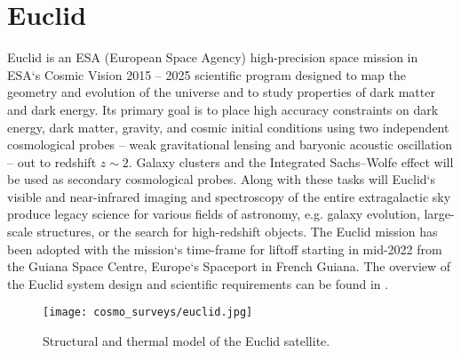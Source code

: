 \section{Euclid}
Euclid is an ESA (European Space Agency) high-precision space mission in ESA`s Cosmic Vision 2015 -- 2025 scientific program designed to map the geometry and evolution of the universe and to study properties of dark matter and dark energy. Its primary goal is to place high accuracy constraints on dark energy, dark matter, gravity, and cosmic initial conditions using two independent cosmological probes -- weak gravitational lensing and baryonic acoustic oscillation -- out to redshift $z\sim2$. Galaxy clusters and the Integrated Sachs--Wolfe effect will be used as secondary cosmological probes. Along with these tasks will Euclid`s visible and near-infrared imaging and spectroscopy of the entire extragalactic sky produce legacy science for various fields of astronomy, e.g. galaxy evolution, large-scale structures, or the search for high-redshift objects. The Euclid mission has been adopted with the mission`s time-frame for liftoff starting in mid-2022 from the Guiana Space Centre, Europe`s Spaceport in French Guiana. The overview of the Euclid system design and scientific requirements can be found in \cite{2011arXiv1110.3193L}.
\begin{figure}[htb]
    \centering
    \texttt{[image: cosmo\_surveys/euclid.jpg]}
    \caption{Structural and thermal model of the Euclid satellite.}
    \label{fig:euclid}
\end{figure}
\clearpage
